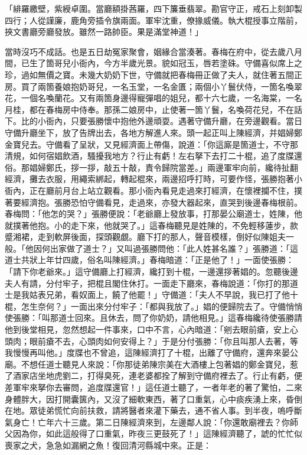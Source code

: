 \begin{showcontents}{}
「緋羅繳壁，紫綬卓圍。當廳額掛茜羅，四下簾垂翡翠。勘官守正，戒石上刻卸製四行；人從謹廉，鹿角旁插令旗兩面。軍牢沈重，僚掾威儀。執大棍授事立階前，挾文書廳旁廳發放。雖然一路帥臣。果是滿堂神道！」

當時沒巧不成話。也是五日劫冤家聚會，姻緣合當湊著。春梅在府中，從去歲八月間，已生了箇哥兒小衙內，今方半歲光景。貌如冠玉，唇若塗硃。守備喜似席上之珍，過如無價之寶。未幾大奶奶下世，守備就把春梅冊正做了夫人，就住著五間正房。買了兩箇養娘抱奶哥兒，一名玉堂，一名金匱；兩個小丫鬟伏侍，一箇名喚翠花，一個名喚蘭花。又有兩箇身邊得寵彈唱的姐兒，都十六七歲，一名海棠，一名月桂，都在春梅房中侍奉。那孫二娘房中，止使著一箇丫鬟，名喚荷花兒，不在話下。比的小衙內，只要張勝懷中抱他外邊頑耍。遇著守備升廳，在旁邊觀看。當日守備升廳坐下，放了告牌出去，各地方解進人來。頭一起正叫上陳經濟，并娼婦鄭金寶兒去。守備看了呈狀，又見經濟面上帶傷，說道：「你這廝是箇道士，不守那清規，如何宿娼飲酒，騷擾我地方？行止有虧！左右拏下去打二十棍，追了度牒還俗。那娼婦鄭氏，拶一拶，敲五十敲，責令歸院當差。」兩邊軍牢向前，纔待扯翻經濟，攤去衣服，用繩索綁起，轉起棍來，兩邊招呼打時，可要作怪，張勝抱著小衙內，正在廳前月台上站立觀看。那小衙內看見走過來打經濟，在懷裡攔不住，撲著要經濟抱。張勝恐怕守備看見，走過來，亦發大器起來，直哭到後邊春梅根前。春梅問：「他怎的哭？」張勝便說：「老爺廳上發放事，打那晏公廟道士，姓陳，他就撲著他抱。小的走下來，他就哭了。」這春梅聽見是姓陳的，不免輕移蓮步，款蹙湘裙，走到軟屏後面，探頭觀覷。廳下打的那人，聲音模樣，倒好似陳姐夫一般。「他因何出家做了道士？」又叫過張勝問他：「此人姓甚名誰？」張勝道：「這道士共狀上年廿四歲，俗名叫陳經濟。」春梅暗道：「正是他了！」一面使張勝：「請下你老爺來。」這守備廳上打經濟，纔打到十棍，一邊還拶著娼的。忽聽後邊夫人有請，分付牢子，把棍且閣住休打。一面走下廳來，春梅說道：「你打的那道士是我姑表兄弟，看奴面上，饒了他罷！」守備道：「夫人不早說，我已打了他十棍，怎生奈何？」一面出來分付牢子：「都與我放了。」娼的便歸院去了。守備悄悄使張勝：「叫那道士回來。且休去，問了你奶奶，請他相見。」這春梅纔待使張勝請他到後堂相見，忽然想起一件事來，口中不言，心內暗道：「剜去眼前瘡，安上心頭肉；眼前瘡不去，心頭肉如何安得上？」于是分付張勝：「你且叫那人去著，等我慢慢再叫他。」度牒也不曾追，這陳經濟打了十棍，出離了守備府，還奔來晏公廟。不想任道士聽見人來說：「你那徒弟陳宗美在大酒樓上包著娼的鄭金寶兒，惹了酒家店坐地虎劉二，打得臭死，連老婆都拴了解到守備府裡去了。行止有虧，便差軍牢來拏你去審問，追度牒還官！」這任道士聽了，一者年老的著了驚怕，二來身體胖大，因打開囊篋內，又沒了細軟東西，著了口重氣，心中痰疾湧上來，昏倒在地。眾徒弟慌忙向前扶救，請將醫者來灌下藥去，通不省人事。到半夜，嗚呼斷氣身亡！亡年六十三歲。第二日陳經濟來到，左邊鄰人說：「你還敢廟裡去？你師父因為你，如此這般得了口重氣，昨夜三更鼓死了！」這陳經濟聽了，諕的忙忙似喪家之犬，急急如漏網之魚！復回清河縣城中來。正是：


\end{showcontents}
